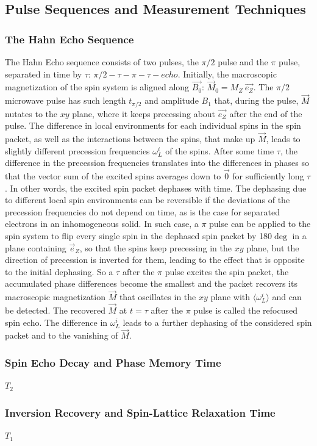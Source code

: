 \subsection{Pulse Sequences and Measurement Techniques}
\subsubsection{The Hahn Echo Sequence}
The Hahn Echo sequence consists of two pulses, the $\pi/2$ pulse and the $\pi$ pulse, separated in time by $\tau$: $\pi/2 - \tau - \pi - \tau - echo$. Initially, the macroscopic magnetization of the spin system is aligned along $\vec{B_0}$: $\vec{M}_0=M_Z~\vec{e_Z}$. The $\pi/2$ microwave pulse has such length $t_{\pi/2}$ and amplitude $B_1$ that, during the pulse, $\vec{M}$ nutates to the $xy$ plane, where it keeps precessing about $\vec{e_Z}$ after the end of the pulse. The difference in local environments for each individual spins in the spin packet, as well as the interactions between the spins, that make up $\vec{M}$, leads to slightly different precession frequencies $\omega_L^i$ of the spins. After some time $\tau$, the difference in the precession frequencies translates into the differences in phases so that the vector sum of the excited spins averages down to $\vec{0}$ for sufficiently long $\tau$. In other words, the excited spin packet dephases with time. The dephasing due to different local spin environments can be reversible if the deviations of the precession frequencies do not depend on time, as is the case for separated electrons in an inhomogeneous solid. In such case, a $\pi$ pulse can be applied to the spin system to flip every single spin in the dephased spin packet by 180$\deg$ in a plane containing $\vec{e}_Z$, so that the spins keep precessing in the $xy$ plane, but the direction of precession is inverted for them, leading to the effect that is opposite to the initial dephasing. So a $\tau$ after the $\pi$ pulse excites the spin packet, the accumulated phase differences become the smallest and the packet recovers its macroscopic magnetization $\vec{M}$ that oscillates in the $xy$ plane with $\langle\omega_L^i\rangle$ and can be detected. The recovered $\vec{M}$ at $t=\tau$ after the $\pi$ pulse is called the refocused spin echo. The difference in $\omega_L^i$ leads to a further dephasing of the considered spin packet and to the vanishing of $\vec{M}$.\\
\subsubsection{Spin Echo Decay and Phase Memory Time}
$T_2$

\subsubsection{Inversion Recovery and Spin-Lattice Relaxation Time}
$T_1$


